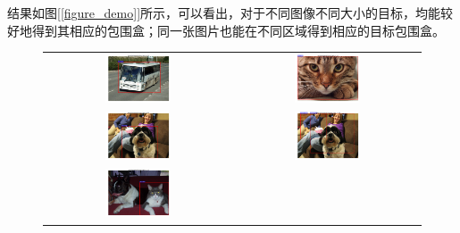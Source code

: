 \documentclass[a4paper, 12pt, UTF8]{article}
\begin{document}
结果如图[\ref{figure_demo}]所示，可以看出，对于不同图像不同大小的目标，均能较好地得到其相应的包围盒；同一张图片也能在不同区域得到相应的目标包围盒。

\begin{figure}[ht!]
    \centering
    \begin{tabular}{cc}
        \includegraphics[width=0.36\textwidth]{figure_1.png} &
        \includegraphics[width=0.36\textwidth]{figure_2.png} \\
        \includegraphics[width=0.36\textwidth]{figure_3.png} &
        \includegraphics[width=0.36\textwidth]{figure_4.png} \\
        \includegraphics[width=0.36\textwidth]{figure_5.png} &

\end{tabular}
\end{figure}
\end{document}
